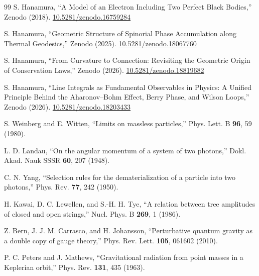 \documentclass[%
 reprint, amsmath,amssymb, aps, prb, ]{revtex4-2}
\numberwithin{equation}{section}
\begin{document}
\begin{thebibliography}{99}
 S. Hanamura, ``A Model of an Electron Including Two Perfect Black Bodies,'' Zenodo (2018). \href{https://doi.org/10.5281/zenodo.16759284}{10.5281/zenodo.16759284}

 S. Hanamura, ``Geometric Structure of Spinorial Phase Accumulation along Thermal Geodesics,'' Zenodo (2025). \href{https://doi.org/10.5281/zenodo.18067760}{10.5281/zenodo.18067760}

 S. Hanamura, ``From Curvature to Connection: Revisiting the Geometric Origin of Conservation Laws,'' Zenodo (2026). \href{https://doi.org/10.5281/zenodo.18819682}{10.5281/zenodo.18819682}

 S. Hanamura, ``Line Integrals as Fundamental Observables in Physics: A Unified Principle Behind the Aharonov--Bohm Effect, Berry Phase, and Wilson Loops,'' Zenodo (2026). \href{https://doi.org/10.5281/zenodo.18203433}{10.5281/zenodo.18203433}

 S. Weinberg and E. Witten, ``Limits on massless particles,'' Phys. Lett. B \textbf{96}, 59 (1980).

 L. D. Landau, ``On the angular momentum of a system of two photons,'' Dokl. Akad. Nauk SSSR \textbf{60}, 207 (1948).

 C. N. Yang, ``Selection rules for the dematerialization of a particle into two photons,'' Phys. Rev. \textbf{77}, 242 (1950).

 H. Kawai, D. C. Lewellen, and S.-H. H. Tye, ``A relation between tree amplitudes of closed and open strings,'' Nucl. Phys. B \textbf{269}, 1 (1986).

 Z. Bern, J. J. M. Carrasco, and H. Johansson, ``Perturbative quantum gravity as a double copy of gauge theory,'' Phys. Rev. Lett. \textbf{105}, 061602 (2010).

 P. C. Peters and J. Mathews, ``Gravitational radiation from point masses in a Keplerian orbit,'' Phys. Rev. \textbf{131}, 435 (1963).

\end{thebibliography}
\end{document}
